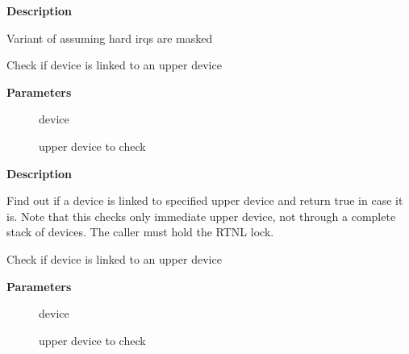 \documentclass[a4paper,8pt,english]{sphinxmanual}
\begin{document}
\textbf{Description}

Variant of {\hyperref[networking/kapi:c.__napi_schedule]{\emph{}}} assuming hard irqs are masked

\begin{fulllineitems}
\label{networking/kapi:c.netdev_has_upper_dev}
Check if device is linked to an upper device

\end{fulllineitems}


\textbf{Parameters}
\begin{description}
\item[{}] \leavevmode
device

\item[{}] \leavevmode
upper device to check

\end{description}

\textbf{Description}

Find out if a device is linked to specified upper device and return true
in case it is. Note that this checks only immediate upper device,
not through a complete stack of devices. The caller must hold the RTNL lock.

\begin{fulllineitems}
\label{networking/kapi:c.netdev_has_upper_dev_all_rcu}
Check if device is linked to an upper device

\end{fulllineitems}


\textbf{Parameters}
\begin{description}
\item[{}] \leavevmode
device

\item[{}] \leavevmode
upper device to check

\end{description}
\end{document}
